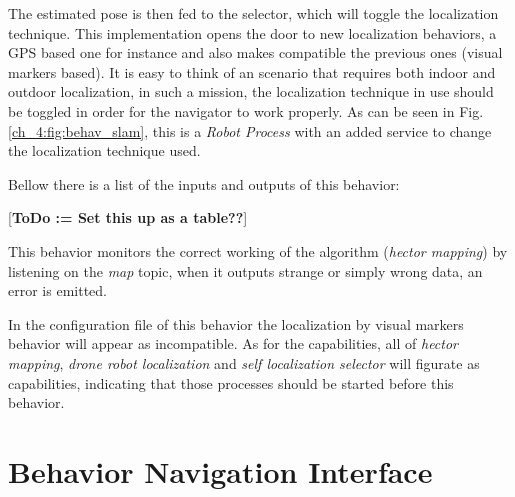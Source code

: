   The estimated pose is then fed to the selector, which will toggle the localization technique. This implementation opens the door to new localization behaviors, a GPS based one for instance and also makes compatible the previous ones (visual markers based). It is easy to think of an scenario that requires both indoor and outdoor localization, in such a mission, the localization technique in use should be toggled in order for the navigator to work properly. As can be seen in Fig. \ref{ch_4:fig:behav_slam}, this is a \textit{Robot Process} with an added service to change the localization technique used.

  Bellow there is a list of the inputs and outputs of this behavior:

  [\textbf{ToDo := Set this up as a table??}]
  

  This behavior monitors the correct working of the algorithm (\textit{hector mapping}) by listening on the \textit{map} topic, when it outputs strange or simply wrong data, an error is emitted.

  In the configuration file of this behavior the localization by visual markers behavior will appear as incompatible. As for the capabilities, all of \textit{hector mapping}, \textit{drone robot localization} and \textit{self localization selector} will figurate as capabilities, indicating that those processes should be started before this behavior.

\section{Behavior Navigation Interface}

  

